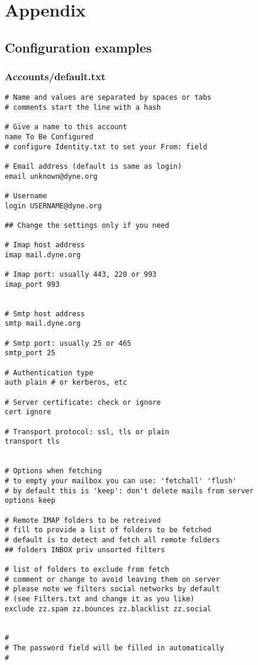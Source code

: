 \documentclass[a4,onecolumn,portrait]{article}
\begin{document}
\section{Appendix}
\label{sec-14}

\subsection{Configuration examples}
\label{sec-14-1}

\subsubsection{Accounts/default.txt}
\label{sec-14-1-1}

\begin{verbatim}
# Name and values are separated by spaces or tabs
# comments start the line with a hash

# Give a name to this account
name To Be Configured
# configure Identity.txt to set your From: field

# Email address (default is same as login)
email unknown@dyne.org

# Username
login USERNAME@dyne.org

## Change the settings only if you need

# Imap host address
imap mail.dyne.org

# Imap port: usually 443, 220 or 993
imap_port 993


# Smtp host address
smtp mail.dyne.org

# Smtp port: usually 25 or 465
smtp_port 25

# Authentication type
auth plain # or kerberos, etc

# Server certificate: check or ignore
cert ignore

# Transport protocol: ssl, tls or plain
transport tls


# Options when fetching
# to empty your mailbox you can use: 'fetchall' 'flush'
# by default this is 'keep': don't delete mails from server
options keep

# Remote IMAP folders to be retreived
# fill to provide a list of folders to be fetched
# default is to detect and fetch all remote folders
## folders INBOX priv unsorted filters 

# list of folders to exclude from fetch
# comment or change to avoid leaving them on server
# please note we filters social networks by default
# (see Filters.txt and change it as you like)
exclude zz.spam zz.bounces zz.blacklist zz.social


#
# The password field will be filled in automatically
#
\end{verbatim}
\end{document}
